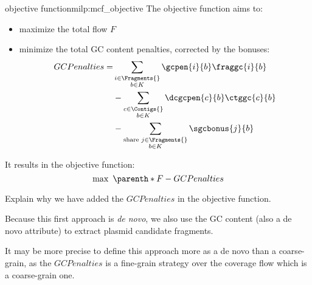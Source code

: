 \begin{definition}{\MCF{} objective function}{milp:mcf_objective}
  The objective function aims to:
  \begin{itemize}
    \item maximize the total flow \(F\)
    \item minimize the total GC content penalties, corrected by the bonuses:
      \begin{align}
        \begin{split}
          GCPenalties = & \sum_{\substack{
              i \in \Fragments{} \\
              b \in K
          }} \gcpen{i}{b} \fraggc{i}{b} \\
          & - \sum_{\substack{
              c \in \Contigs{} \\
              b \in K
          }} \dcgcpen{c}{b}\ctggc{c}{b} \\
          & - \sum_{\substack{
              \text{share } j \in \Fragments{} \\
              b \in K
          }} \sgcbonus{j}{b}
        \end{split}
      \end{align}
  \end{itemize}
  It results in the objective function:
  \begin{equation}
    \max ~ \parenth*{F - GCPenalties}
  \end{equation}
\end{definition}

\begin{todobox}
  Explain why we have added the \(GCPenalties\) in the \MCF{} objective function.

  Because this first approach is \emph{de novo}, we also use the GC content (also a de novo attribute) to extract plasmid candidate fragments.

  \begin{questionbox}
    It may be more precise to define this approach more as a de novo than a coarse-grain, as the \(GCPenalties\) is a fine-grain strategy over the coverage flow which is a coarse-grain one.
  \end{questionbox}
\end{todobox}
